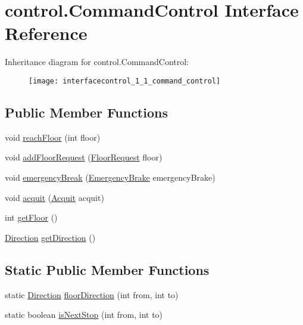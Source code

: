 \hypertarget{interfacecontrol_1_1_command_control}{}\section{control.\+Command\+Control Interface Reference}
\label{interfacecontrol_1_1_command_control}
Inheritance diagram for control.\+Command\+Control\+:\begin{figure}[H]
\begin{center}
\leavevmode
\texttt{[image: interfacecontrol\_1\_1\_command\_control]}
\end{center}
\end{figure}
\subsection*{Public Member Functions}
\begin{DoxyCompactItemize}
\item 
void \mbox{\hyperlink{interfacecontrol_1_1_command_control_aed88af210353f0e854d6da8af1089851}{reach\+Floor}} (int floor)
\item 
void \mbox{\hyperlink{interfacecontrol_1_1_command_control_addb1fea724cbd015456ac62a1dcf556d}{add\+Floor\+Request}} (\mbox{\hyperlink{classcontrol_1_1command_1_1_floor_request}{Floor\+Request}} floor)
\item 
void \mbox{\hyperlink{interfacecontrol_1_1_command_control_a9a32457770712105c8ceffab1c05b95a}{emergency\+Break}} (\mbox{\hyperlink{classcontrol_1_1command_1_1_emergency_brake}{Emergency\+Brake}} emergency\+Brake)
\item 
void \mbox{\hyperlink{interfacecontrol_1_1_command_control_a7eb9b7d638a4680fdf89453ca16a6c93}{acquit}} (\mbox{\hyperlink{classcontrol_1_1command_1_1_acquit}{Acquit}} acquit)
\item 
int \mbox{\hyperlink{interfacecontrol_1_1_command_control_abfefcf986aceb87768275e04df3653f5}{get\+Floor}} ()
\item 
\mbox{\hyperlink{enumcontrol_1_1command_1_1_direction}{Direction}} \mbox{\hyperlink{interfacecontrol_1_1_command_control_af668873aadd297c71867fa707b5ecd55}{get\+Direction}} ()
\end{DoxyCompactItemize}
\subsection*{Static Public Member Functions}
\begin{DoxyCompactItemize}
\item 
static \mbox{\hyperlink{enumcontrol_1_1command_1_1_direction}{Direction}} \mbox{\hyperlink{interfacecontrol_1_1_command_control_a22ab7945cd82bb103b59e5d3103288a3}{floor\+Direction}} (int from, int to)
\item 
static boolean \mbox{\hyperlink{interfacecontrol_1_1_command_control_a4b2de21fece2328d079558688927fad2}{is\+Next\+Stop}} (int from, int to)
\end{DoxyCompactItemize}


